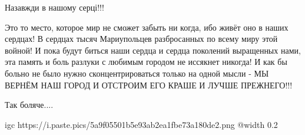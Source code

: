 
Назавжди в нашому серці!!!💖


Это то место, которое мир не сможет забыть ни когда, ибо живёт оно в наших
сердцах! В сердцах тысяч Мариупольцев разбросанных по всему миру этой войной! И
пока будут биться наши сердца и сердца поколений выращенных нами, эта память и
боль разлуки с любимым городом не иссякнет никогда! И как бы больно не было
нужно сконцентрироваться только на одной мысли - МЫ ВЕРНЁМ НАШ ГОРОД И ОТСТРОИМ
ЕГО КРАШЕ И ЛУЧШЕ ПРЕЖНЕГО!!!


Так боляче....


\ifcmt
  igc https://i.paste.pics/5a9f05501b5e93ab2ea1fbe73a180de2.png
	@width 0.2
\fi


